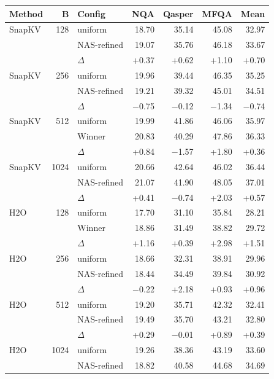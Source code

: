 \begin{table}[tp]
  \centering
  \scriptsize
  \setlength{\tabcolsep}{2.5pt}
  \begin{tabular}{@{}l r l r r r r @{}}
    \toprule
    Method & B & Config & NQA & Qasper & MFQA & Mean \\
    \midrule
    SnapKV & 128 & uniform & 18.70 & 35.14 & 45.08 & 32.97 \\
     &  & NAS-refined & 19.07 & 35.76 & 46.18 & 33.67 \\
     &  & $\Delta$ & +0.37 & +0.62 & +1.10 & +0.70 \\
    \midrule
    SnapKV & 256 & uniform & 19.96 & 39.44 & 46.35 & 35.25 \\
     &  & NAS-refined & 19.21 & 39.32 & 45.01 & 34.51 \\
     &  & $\Delta$ & $-$0.75 & $-$0.12 & $-$1.34 & $-$0.74 \\
    \midrule
    SnapKV & 512 & uniform & 19.99 & 41.86 & 46.06 & 35.97 \\
     &  & Winner & 20.83 & 40.29 & 47.86 & 36.33 \\
     &  & $\Delta$ & +0.84 & $-$1.57 & +1.80 & +0.36 \\
    \midrule
    SnapKV & 1024 & uniform & 20.66 & 42.64 & 46.02 & 36.44 \\
     &  & NAS-refined & 21.07 & 41.90 & 48.05 & 37.01 \\
     &  & $\Delta$ & +0.41 & $-$0.74 & +2.03 & +0.57 \\
    \midrule
    H2O & 128 & uniform & 17.70 & 31.10 & 35.84 & 28.21 \\
     &  & Winner & 18.86 & 31.49 & 38.82 & 29.72 \\
     &  & $\Delta$ & +1.16 & +0.39 & +2.98 & +1.51 \\
    \midrule
    H2O & 256 & uniform & 18.66 & 32.31 & 38.91 & 29.96 \\
     &  & NAS-refined & 18.44 & 34.49 & 39.84 & 30.92 \\
     &  & $\Delta$ & $-$0.22 & +2.18 & +0.93 & +0.96 \\
    \midrule
    H2O & 512 & uniform & 19.20 & 35.71 & 42.32 & 32.41 \\
     &  & NAS-refined & 19.49 & 35.70 & 43.21 & 32.80 \\
     &  & $\Delta$ & +0.29 & $-$0.01 & +0.89 & +0.39 \\
    \midrule
    H2O & 1024 & uniform & 19.26 & 38.36 & 43.19 & 33.60 \\
     &  & NAS-refined & 18.82 & 40.58 & 44.68 & 34.69 \\

\end{tabular}
\end{table}

